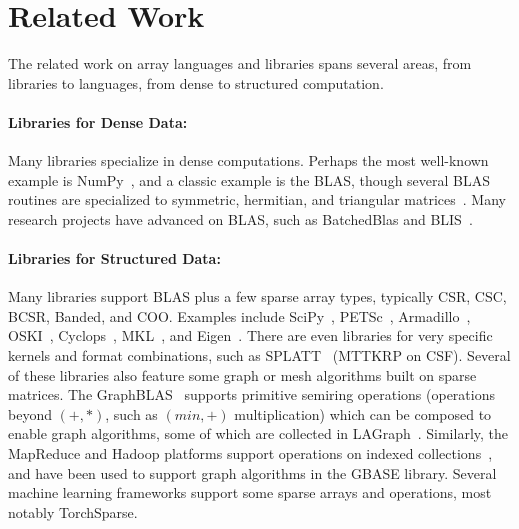 \section{Related Work}

The related work on array languages and libraries spans several areas, from libraries to languages, from dense to structured computation.

\paragraph{Libraries for Dense Data:}
Many libraries specialize in dense computations.
%
Perhaps the most well-known example is NumPy~\cite{harris_array_2020},
and a classic example is the BLAS, though several BLAS routines are specialized to symmetric, hermitian, and triangular matrices~\cite{anderson_lapack_1999}. 
%
Many research projects have advanced on BLAS, such as BatchedBlas and BLIS~\cite{dongarra_design_2017,van_zee_blis:_2015}.

\paragraph{Libraries for Structured Data:}

Many libraries support BLAS plus a few sparse array types, typically CSR, CSC, BCSR, Banded, and COO.
%
Examples include SciPy~\cite{virtanen_scipy_2020}, PETSc~\cite{abhyankar_petsc_nodate}, Armadillo~\cite{rumengan_pyarmadillo_2021}, OSKI~\cite{vuduc_oski:_2005}, Cyclops~\cite{solomonik_cyclops_2013}, MKL~\cite{noauthor_developer_2024}, and Eigen~\cite{guennebaud_eigen_2010}.
%
There are even libraries for very specific kernels and format combinations, such as SPLATT~\cite{smith_splatt:_2015} (MTTKRP on CSF).
%
Several of these libraries also feature some graph or mesh algorithms built on sparse matrices.
%
The GraphBLAS~\cite{kepner_mathematical_2016} supports primitive semiring operations (operations beyond $(+, *)$, such as $(min, +)$ multiplication) which can be composed to enable graph algorithms, some of which are collected in LAGraph~\cite{mattson_lagraph_2019}.
%
Similarly, the MapReduce and Hadoop platforms support operations on indexed collections~\cite{dean_mapreduce_2008}, and have been used to support graph
algorithms in the GBASE library\cite{kang_gbase_2011}.
%
Several machine learning frameworks support some sparse arrays and operations, most notably TorchSparse\cite{tang_torchsparse_2022,tang_torchsparse_2023}.
%

